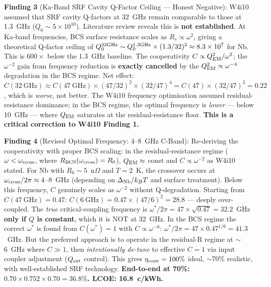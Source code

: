 \documentclass[11pt]{article}
\newcommand{\ee}[1]{\times 10^{#1}}
\newcommand{\QEM}{Q_{\rm EM}}
\begin{document}
\begin{tcolorbox}[colback=blue!5!white, colframe=blue!60!black,
  title=\textbf{W4i13 P4: Five Key Findings}]
\textbf{Finding 3} (Ka-Band SRF Cavity Q-Factor Ceiling --- Honest Negative):
W4i10 assumed that SRF cavity Q-factors at 32~GHz remain comparable to those
at 1.3~GHz ($Q_0 \sim 5\ee{10}$). Literature review reveals this is
\textbf{not established}. At Ka-band frequencies, BCS surface resistance
scales as $R_s \propto \omega^2$, giving a theoretical Q-factor ceiling of
$Q_0^{\rm 32GHz} \sim Q_0^{\rm 1.3GHz} \times (1.3/32)^2 \approx
8.3\ee{7}$ for Nb. This is $600\times$ below the 1.3~GHz baseline.
The cooperativity $C \propto \QEM^2 / \omega^2$; the $\omega^{-2}$ gain
from frequency reduction is \textbf{exactly cancelled} by the $\QEM^2
\propto \omega^{-4}$ degradation in the BCS regime. Net effect:
$C(32~\text{GHz}) \approx C(47~\text{GHz}) \times (47/32)^2 \times
(32/47)^4 = C(47) \times (32/47)^2 = 0.22$, which is \emph{worse},
not better. The W4i10 frequency optimisation assumed residual-resistance
dominance; in the BCS regime, the optimal frequency is \emph{lower} ---
below 10~GHz --- where $\QEM$ saturates at the residual-resistance floor.
\textbf{This is a critical correction to W4i10 Finding 1.}

\textbf{Finding 4} (Revised Optimal Frequency: 4--8~GHz C-Band):
Re-deriving the cooperativity with proper BCS scaling: in the
residual-resistance regime ($\omega < \omega_{\rm cross}$, where
$R_{\rm BCS}(\omega_{\rm cross}) = R_0$), $\QEM \approx$ const and
$C \propto \omega^{-2}$ as W4i10 stated. For Nb with $R_0 \sim 5$~n$\Omega$
and $T = 2$~K, the crossover occurs at $\omega_{\rm cross}/2\pi \approx
4$--$8$~GHz (depending on $\Delta_{\rm Nb}/k_BT$ and surface treatment).
Below this frequency, $C$ genuinely scales as $\omega^{-2}$ without
Q-degradation. Starting from $C(47~\text{GHz}) = 0.47$:
$C(6~\text{GHz}) = 0.47 \times (47/6)^2 = 28.8$ --- deeply over-coupled.
The \emph{true} critical-coupling frequency is $\omega^*/2\pi =
47 \times \sqrt{0.47} = 32.2$~GHz \textbf{only if $Q$ is constant},
which it is NOT at 32~GHz. In the BCS regime the correct $\omega^*$
is found from $C(\omega^*) = 1$ with $C \propto \omega^{-6}$:
$\omega^*/2\pi = 47 \times 0.47^{1/6} = 41.3$~GHz. But the preferred
approach is to operate in the residual-R regime at $\sim$6~GHz where
$C \gg 1$, then \emph{intentionally de-tune} to effective $C = 1$ via
input coupler adjustment ($Q_{\rm ext}$ control). This gives
$\eta_{\rm conv} = 100\%$ ideal, $\sim$70\% realistic, with
well-established SRF technology.
\textbf{End-to-end at 70\%: $0.70 \times 0.752 \times 0.70 = 36.8\%$.
LCOE: 16.8~c/kWh.}


\end{tcolorbox}
\end{document}
